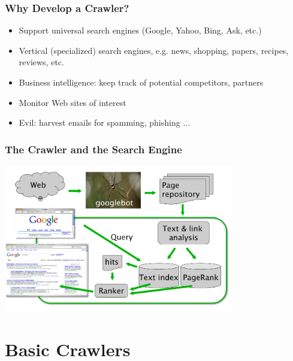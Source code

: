 \documentclass{beamer}
\begin{document}
\begin{frame} \frametitle{Why Develop a Crawler?}

    \begin{itemize}

\item Support universal search engines (Google, Yahoo, Bing, Ask, etc.)
\item Vertical (specialized) search engines, e.g. news, shopping, papers, recipes, reviews, etc.
\item Business intelligence: keep track of potential competitors, partners
\item Monitor Web sites of interest
\item Evil: harvest emails for spamming, phishing ...


\end{itemize}

\end{frame}

\begin{frame} \frametitle{The Crawler and the Search Engine}

 \includegraphics [width=10cm]{crawler-search-engine} 

\end{frame}


\section{Basic Crawlers}
\end{document}
